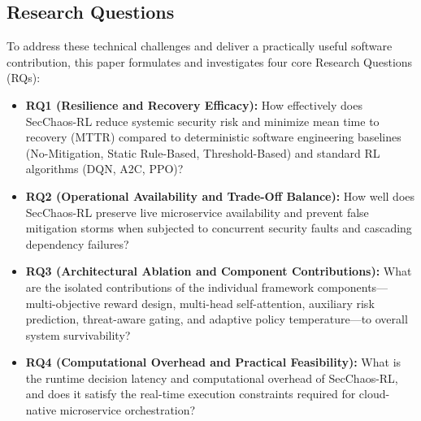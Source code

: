 \documentclass[11pt,a4paper]{article}
\begin{document}
\subsection{Research Questions}
To address these technical challenges and deliver a practically useful software contribution, this paper formulates and investigates four core Research Questions (RQs):
\begin{itemize}
    \item \textbf{RQ1 (Resilience and Recovery Efficacy):} How effectively does SecChaos-RL reduce systemic security risk and minimize mean time to recovery (MTTR) compared to deterministic software engineering baselines (No-Mitigation, Static Rule-Based, Threshold-Based) and standard RL algorithms (DQN, A2C, PPO)?
    \item \textbf{RQ2 (Operational Availability and Trade-Off Balance):} How well does SecChaos-RL preserve live microservice availability and prevent false mitigation storms when subjected to concurrent security faults and cascading dependency failures?
    \item \textbf{RQ3 (Architectural Ablation and Component Contributions):} What are the isolated contributions of the individual framework components—multi-objective reward design, multi-head self-attention, auxiliary risk prediction, threat-aware gating, and adaptive policy temperature—to overall system survivability?
    \item \textbf{RQ4 (Computational Overhead and Practical Feasibility):} What is the runtime decision latency and computational overhead of SecChaos-RL, and does it satisfy the real-time execution constraints required for cloud-native microservice orchestration?
\end{itemize}
\end{document}
